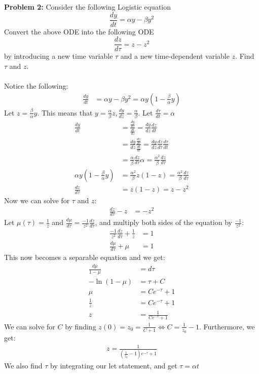 \documentclass[11pt]{article}
\newenvironment{problem}[1]{\textbf{Problem #1: }}{\newpage}
\begin{document}
	\begin{problem}{2}
		Consider the following Logistic equation
		$$\frac{dy}{dt} = \alpha y - \beta y^2$$
		Convert the above ODE into the following ODE
		$$\frac{dz}{d \tau} = z - z^2$$
		by introducing a new time variable $\tau$ and a new time-dependent variable $z$.
		Find $\tau$ and $z$. 
		\\ \\
		Notice the following:
		\begin{align*}
			\frac{dy}{dt} &= \alpha y - \beta y^2 = \alpha y \left(1 - \frac{\beta}{\alpha}y\right)
		\end{align*}
		Let $z = \frac{\beta}{\alpha}y$.  This means that $y = \frac{\alpha}{\beta}z, \frac{dy}{dz} = \frac{\alpha}{\beta}$. Let $\frac{d\tau}{dt} = \alpha$
		\begin{align*}
			\frac{dy}{dt} &= \frac{\frac{dy}{dz}}{\frac{dt}{dz}} = \frac{dy}{dz} \frac{dz}{dt} \\
			&= \frac{dy}{dz} \frac{\frac{dz}{d\tau}}{\frac{dt}{d\tau}} = \frac{dy}{dz}\frac{dz}{d\tau}\frac{d\tau}{dt} \\
			&= \frac{\alpha}{\beta}\frac{dz}{d\tau}\alpha = \frac{\alpha^2}{\beta}\frac{dz}{d\tau} \\
			\alpha y \left(1 - \frac{\beta}{\alpha}y\right) &= \frac{\alpha^2}{\beta}z(1- z) = \frac{\alpha^2}{\beta}\frac{dz}{d\tau} \\
			\frac{dz}{d\tau} &= z(1-z) = z - z^2
		\end{align*}
		\newpage
		Now we can solve for $\tau$ and $z$:
			\begin{align*}
				\frac{dz}{d \tau} - z &= -z^2 
			\end{align*}
			Let $\mu(\tau) = \frac{1}{z}$ and $\frac{d\mu}{d\tau} = \frac{-1}{z^2}\frac{dz}{d\tau}$, and multiply both sides of the equation by $\frac{-1}{z^2}$:
			\begin{align*}
				\frac{-1}{z^2}\frac{dz}{d \tau} + \frac{1}{z} &= 1 \\
				\frac{d\mu}{d\tau} + \mu &= 1
			\end{align*}
			This now becomes a separable equation and we get:
			\begin{align*}
				\frac{d\mu}{1 - \mu} &= d\tau \\
				-\ln(1 - \mu) &= \tau + C	\\
				\mu &= Ce^{-\tau} + 1 \\
				\frac{1}{z} &= Ce^{-\tau} + 1 \\
				z &= \frac{1}{Ce^{-\tau} + 1}
			\end{align*}
			We can solve for $C$ by finding $z(0) = z_0 = \frac{1}{C + 1} \Longleftrightarrow C = \frac{1}{z_0} - 1$.  Furthermore, we get:
			\begin{align*}
				z = \frac{1}{\left(\frac{1}{z_0} - 1\right)e^{-\tau} + 1}
			\end{align*}
			We also find $\tau$ by integrating our let statement, and get $\tau = \alpha t$
	\end{problem}
\end{document}
